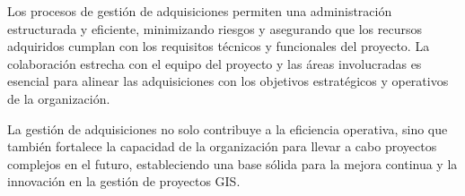 Los procesos de gestión de adquisiciones permiten una administración estructurada y eficiente, minimizando riesgos y asegurando que los recursos adquiridos cumplan con los requisitos técnicos y funcionales del proyecto. La colaboración estrecha con el equipo del proyecto y las áreas involucradas es esencial para alinear las adquisiciones con los objetivos estratégicos y operativos de la organización.

La gestión de adquisiciones no solo contribuye a la eficiencia operativa, sino que también fortalece la capacidad de la organización para llevar a cabo proyectos complejos en el futuro, estableciendo una base sólida para la mejora continua y la innovación en la gestión de proyectos GIS.